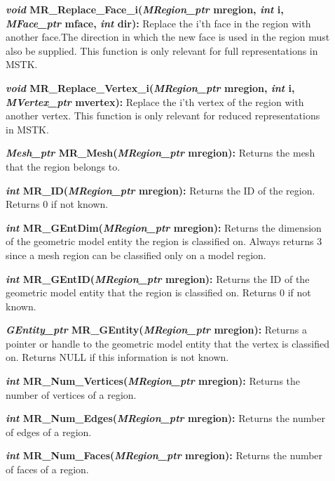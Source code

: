 \documentclass[12pt]{article}
\begin{document}
\begin{description}
\item[]{\bf {\em void}
    MR\_Replace\_Face\_i({\em MRegion\_ptr} mregion, {\em int}
    i, {\em MFace\_ptr} mface, {\em int} dir):} Replace the i'th
  face in the region with another face.The direction in which the new
  face is used in the region must also be supplied. This function is
  only relevant for full representations in MSTK.
  
\item[]{\bf {\em void}
    MR\_Replace\_Vertex\_i({\em MRegion\_ptr} mregion, {\em int}
    i, {\em MVertex\_ptr} mvertex):} Replace the i'th vertex of the
  region with another vertex. This function is only relevant for
  reduced representations in MSTK.

\item[]

  
\item[]{\bf {\em Mesh\_ptr} MR\_Mesh({\em MRegion\_ptr}
    mregion):} Returns the mesh that the region belongs to.
  
\item[]{\bf {\em int} MR\_ID({\em MRegion\_ptr} mregion):}
  Returns the ID of the region. Returns 0 if not known.
  
\item[]{\bf {\em int} MR\_GEntDim({\em MRegion\_ptr}
    mregion):} Returns the dimension of the geometric model entity the
  region is classified on. Always returns 3 since a mesh region can be
  classified only on a model region.
  
\item[]{\bf {\em int} MR\_GEntID({\em MRegion\_ptr}
    mregion):} Returns the ID of the geometric model entity that the
  region is classified on. Returns 0 if not known.
  
\item[]{\bf {\em GEntity\_ptr} MR\_GEntity({\em MRegion\_ptr}
    mregion):} Returns a pointer or handle to the geometric model
  entity that the vertex is classified on. Returns NULL if this
  information is not known.

\item[]

\item[]{\bf {\em int} MR\_Num\_Vertices({\em MRegion\_ptr}
mregion):} Returns the number of vertices of a region.

\item[]{\bf {\em int} MR\_Num\_Edges({\em MRegion\_ptr} mregion):}
Returns the number of edges of a region.

\item[]{\bf {\em int} MR\_Num\_Faces({\em MRegion\_ptr} mregion):}
Returns the number of faces of a region.


\end{description}
\end{document}
